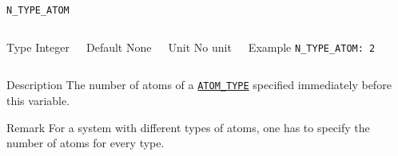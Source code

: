 \begin{frame}[allowframebreaks]{\texttt{N\_TYPE\_ATOM}} \label{N_TYPE_ATOM}
\vspace*{-12pt}
\begin{columns}
\begin{block}{Type}
Integer
\end{block}

\begin{block}{Default}
None
\end{block}

\begin{block}{Unit}
No unit
\end{block}

\begin{block}{Example}
\texttt{N\_TYPE\_ATOM: 2}  
\end{block}
\end{columns}

\begin{block}{Description}
The number of atoms of a \hyperlink{ATOM_TYPE}{\texttt{ATOM\_TYPE}} specified immediately before this variable.
\end{block}

\begin{block}{Remark}
For a system with different types of atoms, one has to specify the number of atoms for every type.
\end{block}

\end{frame}



